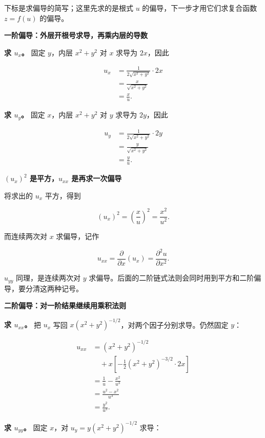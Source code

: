 \documentclass[UTF8,11pt,fontset=windows]{ctexart}
\begin{document}
下标是求偏导的简写；这里先求的是根式 $u$ 的偏导，下一步才用它们求复合函数 $z=f(u)$ 的偏导。

{\bfseries 一阶偏导：外层开根号求导，再乘内层的导数\par}
\textbf{求 $u_x$。} 固定 $y$，内层 $x^2+y^2$ 对 $x$ 求导为 $2x$，因此

$$
\begin{aligned}
u_x
&=\frac{1}{2\sqrt{x^2+y^2}}\cdot2x\\
&=\frac{x}{\sqrt{x^2+y^2}}\\
&=\frac xu.
\end{aligned}
$$

\textbf{求 $u_y$。} 固定 $x$，内层 $x^2+y^2$ 对 $y$ 求导为 $2y$，因此

$$
\begin{aligned}
u_y
&=\frac{1}{2\sqrt{x^2+y^2}}\cdot2y\\
&=\frac{y}{\sqrt{x^2+y^2}}\\
&=\frac yu.
\end{aligned}
$$

{\bfseries $(u_x)^2$ 是平方，$u_{xx}$ 是再求一次偏导\par}
将求出的 $u_x$ 平方，得到

$$
(u_x)^2=\left(\frac xu\right)^2=\frac{x^2}{u^2}.
$$

而连续两次对 $x$ 求偏导，记作

$$
u_{xx}=\frac{\partial}{\partial x}(u_x)=\frac{\partial^2u}{\partial x^2}.
$$

$u_{yy}$ 同理，是连续两次对 $y$ 求偏导。后面的二阶链式法则会同时用到平方和二阶偏导，要分清这两种记号。

{\bfseries 二阶偏导：对一阶结果继续用乘积法则\par}
\textbf{求 $u_{xx}$。} 把 $u_x$ 写回 $x(x^2+y^2)^{-1/2}$，对两个因子分别求导。仍然固定 $y$：

$$
\begin{aligned}
u_{xx}
&=(x^2+y^2)^{-1/2}\\
&\quad+x\left[-\frac12(x^2+y^2)^{-3/2}\cdot2x\right]\\
&=\frac1u-\frac{x^2}{u^3}\\
&=\frac{u^2-x^2}{u^3}\\
&=\frac{y^2}{u^3}.
\end{aligned}
$$

\textbf{求 $u_{yy}$。} 固定 $x$，对 $u_y=y(x^2+y^2)^{-1/2}$ 求导：
\end{document}
